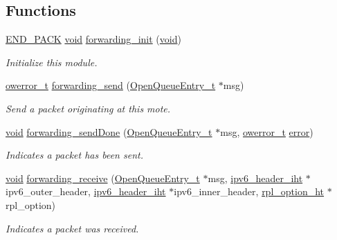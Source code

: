 \subsection*{Functions}
\begin{DoxyCompactItemize}
\item 
\hyperlink{toolchain__defs_8h_a6e6e74e14acee2db089b33d772e3265f}{E\+N\+D\+\_\+\+P\+A\+CK} \hyperlink{usb__devapi_8h_afabf60e7f57651d6d595a02c75f07cd0}{void} \hyperlink{group___forwarding_gae600edfbe024170f4eedb417d85d8e90}{forwarding\+\_\+init} (\hyperlink{usb__devapi_8h_afabf60e7f57651d6d595a02c75f07cd0}{void})
\begin{DoxyCompactList}\small\item\em Initialize this module. \end{DoxyCompactList}\item 
\hyperlink{opendefs_8h_af20b7c3ed9d2ba19e56a309ad9314803}{owerror\+\_\+t} \hyperlink{group___forwarding_ga25d2a7dbc2a0f5e5dda70ff43ef25cb4}{forwarding\+\_\+send} (\hyperlink{struct_open_queue_entry__t}{Open\+Queue\+Entry\+\_\+t} $\ast$msg)
\begin{DoxyCompactList}\small\item\em Send a packet originating at this mote. \end{DoxyCompactList}\item 
\hyperlink{usb__devapi_8h_afabf60e7f57651d6d595a02c75f07cd0}{void} \hyperlink{group___forwarding_gae2d3a3aeedf39da862539fae72235464}{forwarding\+\_\+send\+Done} (\hyperlink{struct_open_queue_entry__t}{Open\+Queue\+Entry\+\_\+t} $\ast$msg, \hyperlink{opendefs_8h_af20b7c3ed9d2ba19e56a309ad9314803}{owerror\+\_\+t} \hyperlink{disk_8c_ad018a3100b2dabad325a0800152db297}{error})
\begin{DoxyCompactList}\small\item\em Indicates a packet has been sent. \end{DoxyCompactList}\item 
\hyperlink{usb__devapi_8h_afabf60e7f57651d6d595a02c75f07cd0}{void} \hyperlink{group___forwarding_gafc64a413d826b5aaedc27869fc165314}{forwarding\+\_\+receive} (\hyperlink{struct_open_queue_entry__t}{Open\+Queue\+Entry\+\_\+t} $\ast$msg, \hyperlink{structipv6__header__iht}{ipv6\+\_\+header\+\_\+iht} $\ast$ipv6\+\_\+outer\+\_\+header, \hyperlink{structipv6__header__iht}{ipv6\+\_\+header\+\_\+iht} $\ast$ipv6\+\_\+inner\+\_\+header, \hyperlink{structrpl__option__ht}{rpl\+\_\+option\+\_\+ht} $\ast$rpl\+\_\+option)
\begin{DoxyCompactList}\small\item\em Indicates a packet was received. \end{DoxyCompactList}\end{DoxyCompactItemize}


